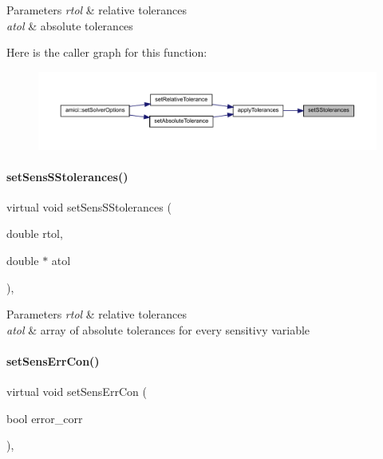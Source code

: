 \begin{DoxyParams}{Parameters}
{\em rtol} & relative tolerances \\
\hline
{\em atol} & absolute tolerances \\
\hline
\end{DoxyParams}
Here is the caller graph for this function\+:
\nopagebreak
\begin{figure}[H]
\begin{center}
\leavevmode
\includegraphics[width=350pt]{classamici_1_1_solver_a6a688afa51ec71eded6c8801faaafac3_icgraph}
\end{center}
\end{figure}
\mbox{\label{classamici_1_1_solver_a16ec3b994dd433e71fcb58eea3cd529f}} 
\paragraph{\texorpdfstring{setSensSStolerances()}{setSensSStolerances()}}
{\footnotesize\ttfamily virtual void set\+Sens\+S\+Stolerances (\begin{DoxyParamCaption}\item[{double}]{rtol,  }\item[{double $\ast$}]{atol }\end{DoxyParamCaption})\hspace{0.3cm}{\ttfamily [protected]}, {}}


\begin{DoxyParams}{Parameters}
{\em rtol} & relative tolerances \\
\hline
{\em atol} & array of absolute tolerances for every sensitivy variable \\
\hline
\end{DoxyParams}
\mbox{\label{classamici_1_1_solver_a1928530b3110cb9229d6836c5389379f}} 
\paragraph{\texorpdfstring{setSensErrCon()}{setSensErrCon()}}
{\footnotesize\ttfamily virtual void set\+Sens\+Err\+Con (\begin{DoxyParamCaption}\item[{bool}]{error\+\_\+corr }\end{DoxyParamCaption})\hspace{0.3cm}{\ttfamily [protected]}, {}}


